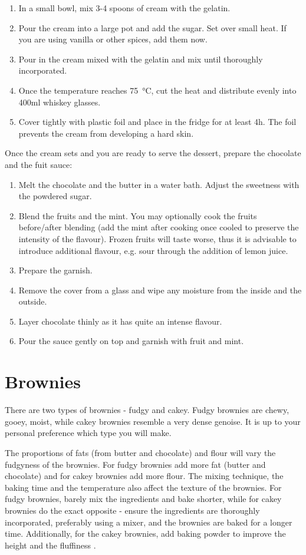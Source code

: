 \begin{enumerate}
  \item In a small bowl, mix 3-4 spoons of cream with the gelatin.
  \item Pour the cream into a large pot and add the sugar. Set over small heat.
    If you are using vanilla or other spices, add them now.
  \item Pour in the cream mixed with the gelatin and mix until thoroughly
    incorporated.
  \item Once the temperature reaches \SI{75}{\celsius}, cut the heat and
    distribute evenly into 400ml whiskey glasses.
  \item Cover tightly with plastic foil and place in the fridge for at least 4h.
    The foil prevents the cream from developing a hard skin.
\end{enumerate}

Once the cream sets and you are ready to serve the dessert, prepare the
chocolate and the fuit sauce:
\begin{enumerate}
  \item Melt the chocolate and the butter in a water bath. Adjust the sweetness
    with the powdered sugar.
  \item Blend the fruits and the mint. You may optionally cook the fruits
    before/after blending (add the mint after cooking once cooled to preserve
    the intensity of the flavour). Frozen fruits will taste worse, thus it is
    advisable to introduce additional flavour, e.g. sour through the addition
    of lemon juice.
  \item Prepare the garnish.
  \item Remove the cover from a glass and wipe any moisture from the inside and
    the outside.
  \item Layer chocolate thinly as it has quite an intense flavour.
  \item Pour the sauce gently on top and garnish with fruit and mint.
\end{enumerate}

\section{Brownies}
There are two types of brownies - fudgy and cakey. Fudgy brownies are chewy,
gooey, moist, while cakey brownies resemble a very dense genoise. It is up to
your personal preference which type you will make.

The proportions of fats (from butter and chocolate) and flour will vary the
fudgyness of the brownies. For fudgy brownies add more fat (butter and
chocolate) and for cakey brownies add more flour. The mixing technique, the
baking time and the temperature also affect the texture of the brownies. For
fudgy brownies, barely mix the ingredients and bake shorter, while for cakey
brownies do the exact opposite - ensure the ingredients are thoroughly
incorporated, preferably using a mixer, and the brownies are baked for a longer
time. Additionally, for the cakey brownies, add baking powder to improve the
height and the fluffiness .


